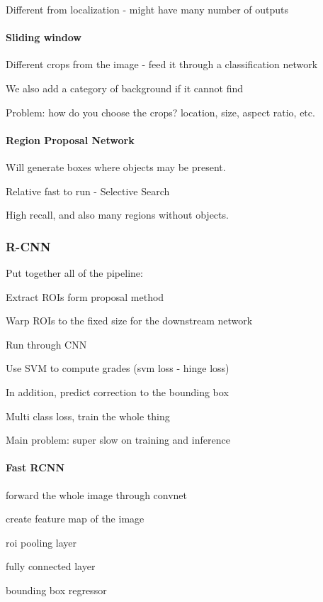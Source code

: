 Different from localization - might have many number of outputs

\paragraph{Sliding window}

Different crops from the image - feed it through a classification network

We also add a category of background if it cannot find

Problem: how do you choose the crops? location, size, aspect ratio, etc.

\paragraph{Region Proposal Network}

Will generate boxes where objects may be present.

Relative fast to run - Selective Search

High recall, and also many regions without objects.

\subsubsection{R-CNN}

Put together all of the pipeline: 

Extract ROIs form proposal method

Warp ROIs to the fixed size for the downstream network

Run through CNN

Use SVM to compute grades (svm loss - hinge loss)

In addition, predict correction to the bounding box

Multi class loss, train the whole thing

Main problem: super slow on training and inference

\paragraph{Fast RCNN}

forward the whole image through convnet

create feature map of the image

roi pooling layer

fully connected layer

bounding box regressor

